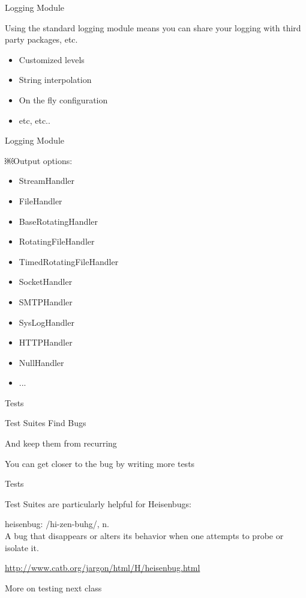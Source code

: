 \documentclass{beamer}
\begin{document}
\begin{frame}[fragile]{Logging Module}

{\LARGE Using the standard logging module means you can share your logging with third
party packages, etc.}

\vfill
\begin{itemize}
  \item Customized levels
  \item String interpolation
  \item On the fly configuration
  \item etc, etc..
\end{itemize}

\end{frame} 

\begin{frame}[fragile]{Logging Module}

{\LARGE ￼Output options:}

\vfill
\begin{itemize}
\item StreamHandler 
\item FileHandler 
\item BaseRotatingHandler 
\item RotatingFileHandler 
\item TimedRotatingFileHandler 
\item SocketHandler 
\item SMTPHandler 
\item SysLogHandler 
\item HTTPHandler 
\item NullHandler 
\item ...
\end{itemize}

\end{frame} 


\begin{frame}[fragile]{Tests}

{\LARGE Test Suites Find Bugs}

\vfill
{\LARGE And keep them from recurring}

\vfill
{\LARGE You can get closer to the bug by writing more tests}

\end{frame} 

\begin{frame}[fragile]{Tests}

{\LARGE Test Suites are particularly helpful for Heisenbugs:}

\vfill
heisenbug: /hi-zen-buhg/, n.\\[0.1in]
A bug that disappears or alters its behavior when one attempts to probe or isolate it.

\vfill
\url{http://www.catb.org/jargon/html/H/heisenbug.html}

\vfill
{\Large More on testing next class}

\end{frame} 
\end{document}

